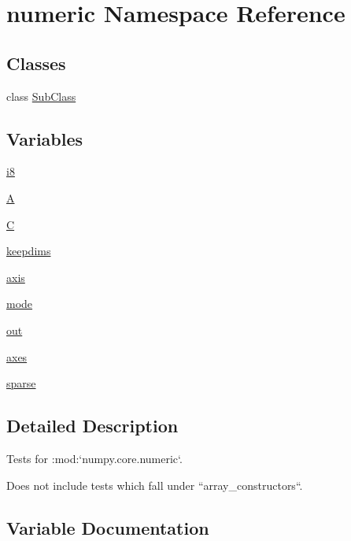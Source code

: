 \hypertarget{namespacenumeric}{}\section{numeric Namespace Reference}
\label{namespacenumeric}
\subsection*{Classes}
\begin{DoxyCompactItemize}
\item 
class \hyperlink{classnumeric_1_1SubClass}{Sub\+Class}
\end{DoxyCompactItemize}
\subsection*{Variables}
\begin{DoxyCompactItemize}
\item 
\hyperlink{namespacenumeric_a29a433a6d641eaf73e9c8947cf8c7773}{i8}
\item 
\hyperlink{namespacenumeric_a8e46afebc6cfa771ebe979b2832ada6b}{A}
\item 
\hyperlink{namespacenumeric_a4dcd865748dbe8b228fcd720979804ed}{C}
\item 
\hyperlink{namespacenumeric_a8545e06973fc914dbf09cd8760ef20d3}{keepdims}
\item 
\hyperlink{namespacenumeric_aa984a7382d8be3ba223b615738ff01ac}{axis}
\item 
\hyperlink{namespacenumeric_a8b3990edadcabbf4462fcd53c053d0a5}{mode}
\item 
\hyperlink{namespacenumeric_a9984f5ab6fd0517c5e480780e77b028d}{out}
\item 
\hyperlink{namespacenumeric_a7578cd91547e1ca81d5672863ddffcfb}{axes}
\item 
\hyperlink{namespacenumeric_a124a5d6ecb3f91d908cf4741e7d203a8}{sparse}
\end{DoxyCompactItemize}


\subsection{Detailed Description}
\begin{DoxyVerb}Tests for :mod:`numpy.core.numeric`.

Does not include tests which fall under ``array_constructors``.\end{DoxyVerb}
 

\subsection{Variable Documentation}
\mbox{\label{namespacenumeric_a8e46afebc6cfa771ebe979b2832ada6b}} 
